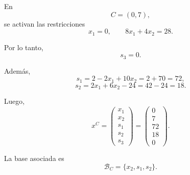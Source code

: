 En
\[
C=(0,7),
\]
se activan las restricciones
\[
x_1=0,
\qquad
8x_1+4x_2=28.
\]

Por lo tanto,
\[
s_3=0.
\]

Además,
\[
s_1=2-2x_1+10x_2=2+70=72,
\]
\[
s_2=2x_1+6x_2-24=42-24=18.
\]

Luego,
\[
x^C=
\begin{pmatrix}
x_1\\
x_2\\
s_1\\
s_2\\
s_3
\end{pmatrix}
=
\begin{pmatrix}
0\\
7\\
72\\
18\\
0
\end{pmatrix}.
\]

La base asociada es
\[
\mathcal{B}_C=\{x_2,s_1,s_2\}.
\]
